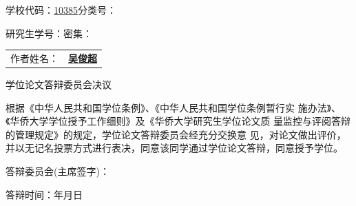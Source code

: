 \documentclass{report}
\begin{document}
\ttfamily\fontsize{10.5pt}{21pt}\selectfont
\noindent 学校代码：\hspace{6pt}\underline{\textrm{10385}}\hfill 分类号：\underline{\hspace{72pt}}

\noindent 研究生学号：\underline{\hspace{140pt}}\hfill 密\hspace{10.5pt}集：\underline{\hspace{72pt}}

\begin{figure}[H]
\noindent{}
\end{figure}

\fontsize{14pt}{21pt}\selectfont
\begin{tabular}{cc}
    \textsf{作者姓名：}& \textrm{\underline{\textbf{吴俊超}}} \\
\end{tabular}

\newpage
\begin{center}
\sffamily\fontsize{16pt}{25pt}\selectfont 学\hspace{8pt}位\hspace{8pt}论\hspace{8pt}文\hspace{8pt}答\hspace{8pt}辩\hspace{8pt}委\hspace{8pt}员\hspace{8pt}会\hspace{8pt}决\hspace{8pt}议
\end{center} \vspace{51pt}
\fontsize{14pt}{26pt}\selectfont
\noindent\hspace{28pt}\rmfamily 根据《中华人民共和国学位条例》、《中华人民共和国学位条例暂行实 施办法》、《华侨大学学位授予工作细则》及《华侨大学研究生学位论文质 量监控与评阅答辩的管理规定》的规定，学位论文答辩委员会经充分交换意 见，对论文做出评价，并以无记名投票方式进行表决，同意该同学通过\degree 学位论文答辩，同意授予\degree 学位。\vspace{192pt}

\noindent\flushright 答辩委员会(主席签字)：\underline{\hspace{156pt}}\vspace{14pt}

\noindent\flushright 答辩时间：\underline{\hspace{60pt}}年\underline{\hspace{25pt}}月\underline{\hspace{25pt}}日
\restoregeometry
\end{document}

